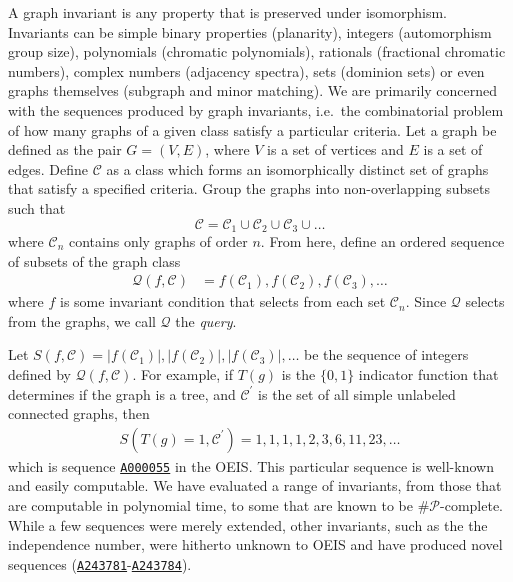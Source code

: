 \documentclass[12pt]{article}
\newcommand{\OEIS}[1]
{\href{https://oeis.org/#1}{\texttt{#1}}}
\newcommand{\SEQ}{S}
\newcommand{\QUERY}{\mathcal{Q}}
\newcommand{\CLASS}{\mathcal{C}}
\newcommand{\ie}[0]{i.e.\ }
\newcommand{\indicatorfunctionX}[1]{{#1}(g)}
\newcommand{\VARtree}{T}
\newcommand{\VARistree}
{\indicatorfunctionX{\VARtree}}
\begin{document}
A graph invariant is any property that is preserved under isomorphism. 
Invariants can be simple binary properties (planarity), integers (automorphism group size), polynomials (chromatic polynomials), rationals (fractional chromatic numbers), complex numbers (adjacency spectra), sets (dominion sets) or even graphs themselves (subgraph and minor matching). 
We are primarily concerned with the sequences produced by graph invariants, \ie the combinatorial problem of how many graphs of a given class satisfy a particular criteria.
Let a graph be defined as the pair $G = (V,E)$, where $V$ is a set of vertices and $E$ is a set of edges. 
Define $\CLASS$ as a class which forms an isomorphically distinct set of graphs that satisfy a specified criteria.
Group the graphs into non-overlapping subsets such that
\begin{equation}
\CLASS = \CLASS_1 \cup \CLASS_2 \cup \CLASS_3 \cup \ldots
\end{equation}
where $\CLASS_n$ contains only graphs of order $n$.
From here, define an ordered sequence of subsets of the graph class
%
\begin{align}
\QUERY(f, \CLASS) 
&= f(\CLASS_1), f(\CLASS_2), f(\CLASS_3), \ldots
\end{align}
%
where $f$ is some invariant condition that selects from each set $\CLASS_n$.
Since $\QUERY$ selects from the graphs, we call $\QUERY$ the \textit{query}.

Let 
$\SEQ(f, \CLASS) = |f(\CLASS_1)|, |f(\CLASS_2)|, |f(\CLASS_3)|, \ldots$
be the sequence of integers defined by $\QUERY(f, \CLASS)$. 
For example, if $\VARistree$ is the $\{0,1\}$ indicator function that determines if the graph is a tree, and $\CLASS^\prime$ is the set of all simple unlabeled connected graphs, then
%
\begin{align}
S(\VARistree=1, \CLASS^\prime) = 1, 1, 1, 1, 2, 3, 6, 11, 23, \ldots
\end{align}
%
which is sequence \OEIS{A000055} in the OEIS.
This particular sequence is well-known and easily computable.
We have evaluated a range of invariants, from those that are computable in polynomial time, to some that are known to be $\mathcal{\#P}$-complete.
While a few sequences were merely extended, other invariants, such as the the independence number, were hitherto unknown to OEIS and have produced novel sequences (\OEIS{A243781}-\OEIS{A243784}).
\end{document}
